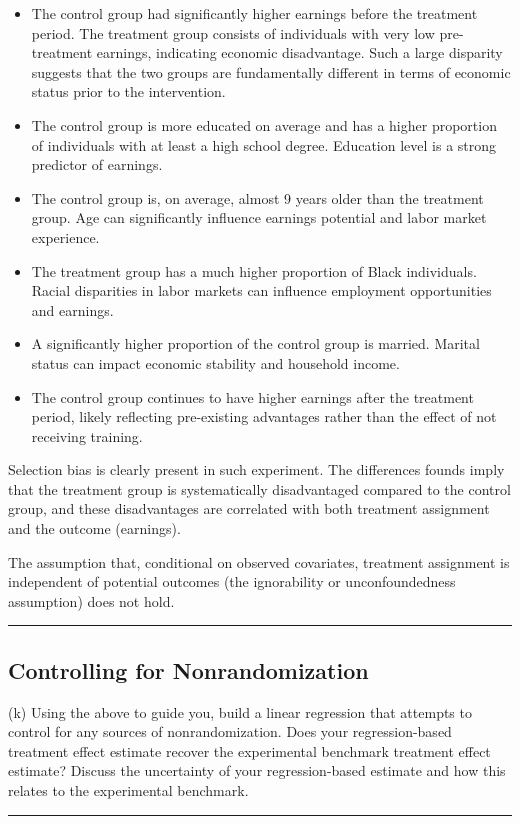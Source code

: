 \documentclass{article}
\newenvironment{colorparagraph}[1]{\par\color{#1}}{\par}
\begin{document}
\begin{itemize}
    \item The control group had significantly higher earnings before the treatment period. The treatment group consists of individuals with very low pre-treatment earnings, indicating economic disadvantage. Such a large disparity suggests that the two groups are fundamentally different in terms of economic status prior to the intervention.
    \item The control group is more educated on average and has a higher proportion of individuals with at least a high school degree. Education level is a strong predictor of earnings.
    \item The control group is, on average, almost 9 years older than the treatment group. Age can significantly influence earnings potential and labor market experience.
    \item The treatment group has a much higher proportion of Black individuals. Racial disparities in labor markets can influence employment opportunities and earnings.
    \item A significantly higher proportion of the control group is married. Marital status can impact economic stability and household income.
    \item The control group continues to have higher earnings after the treatment period, likely reflecting pre-existing advantages rather than the effect of not receiving training.
\end{itemize}

Selection bias is clearly present in such experiment. The differences founds imply that the treatment group is systematically disadvantaged compared to the control group, and these disadvantages are correlated with both treatment assignment and the outcome (earnings).

The assumption that, conditional on observed covariates, treatment assignment is independent of potential outcomes (the ignorability or unconfoundedness assumption) does not hold.

\begin{colorparagraph}{questioncolor}
\rule{\textwidth}{0.5pt}

\label{q4k}\subsection{Controlling for Nonrandomization}
(k) Using the above to guide you, build a linear regression that attempts to control for any sources of nonrandomization. Does your regression-based treatment effect estimate recover the experimental benchmark treatment effect estimate? Discuss the uncertainty of your regression-based estimate and how this relates to the experimental benchmark.

\rule{\textwidth}{0.5pt}
\end{colorparagraph}
\end{document}
